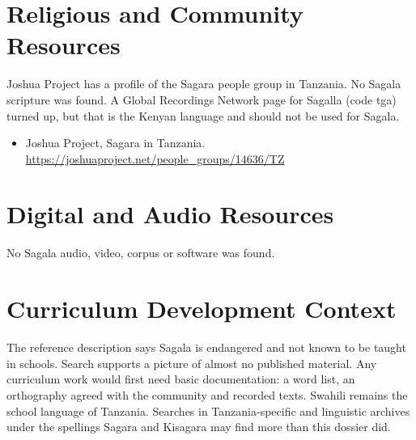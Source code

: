 \documentclass[12pt]{article}
\begin{document}
\section{Religious and Community Resources}
Joshua Project has a profile of the Sagara people group in Tanzania. No Sagala scripture was found. A Global Recordings Network page for Sagalla (code tga) turned up, but that is the Kenyan language and should not be used for Sagala.
\begin{itemize}
\item Joshua Project, Sagara in Tanzania. \url{https://joshuaproject.net/people_groups/14636/TZ}
\end{itemize}

\section{Digital and Audio Resources}
No Sagala audio, video, corpus or software was found.

\section{Curriculum Development Context}
The reference description says Sagala is endangered and not known to be taught in schools. Search supports a picture of almost no published material. Any curriculum work would first need basic documentation: a word list, an orthography agreed with the community and recorded texts. Swahili remains the school language of Tanzania. Searches in Tanzania-specific and linguistic archives under the spellings Sagara and Kisagara may find more than this dossier did.
\end{document}
